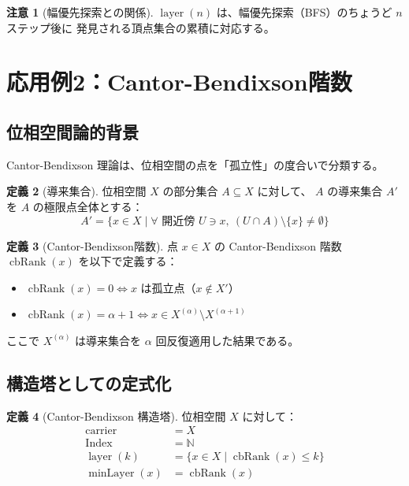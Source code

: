 \documentclass[a4paper,12pt]{ltjsarticle}
\theoremstyle{definition}
\newtheorem{definition}{定義}[section]
\newtheorem{remark}[definition]{注意}
\newcommand{\N}{\mathbb{N}}
\DeclareMathOperator{\layer}{layer}
\DeclareMathOperator{\minLayer}{minLayer}
\DeclareMathOperator{\cbRank}{cbRank}
\begin{document}
\begin{remark}[幅優先探索との関係]
$\layer(n)$ は、幅優先探索（BFS）のちょうど $n$ ステップ後に
発見される頂点集合の累積に対応する。
\end{remark}

\section{応用例2：Cantor-Bendixson階数}

\subsection{位相空間論的背景}

Cantor-Bendixson 理論は、位相空間の点を「孤立性」の度合いで分類する。

\begin{definition}[導来集合]
位相空間 $X$ の部分集合 $A \subseteq X$ に対して、
$A$ の導来集合 $A'$ を $A$ の極限点全体とする：
\[
A' = \{x \in X \mid \forall \text{ 開近傍 } U \ni x,\ (U \cap A) \setminus \{x\} \neq \emptyset\}
\]
\end{definition}

\begin{definition}[Cantor-Bendixson階数]
点 $x \in X$ の Cantor-Bendixson 階数 $\cbRank(x)$ を以下で定義する：
\begin{itemize}
  \item $\cbRank(x) = 0 \iff x$ は孤立点（$x \notin X'$）
  \item $\cbRank(x) = \alpha + 1 \iff x \in X^{(\alpha)} \setminus X^{(\alpha+1)}$
\end{itemize}
ここで $X^{(\alpha)}$ は導来集合を $\alpha$ 回反復適用した結果である。
\end{definition}

\subsection{構造塔としての定式化}

\begin{definition}[Cantor-Bendixson 構造塔]
位相空間 $X$ に対して：
\begin{align*}
\mathrm{carrier} &= X \\
\mathrm{Index} &= \N \\
\layer(k) &= \{x \in X \mid \cbRank(x) \leq k\} \\
\minLayer(x) &= \cbRank(x)
\end{align*}
\end{definition}
\end{document}
